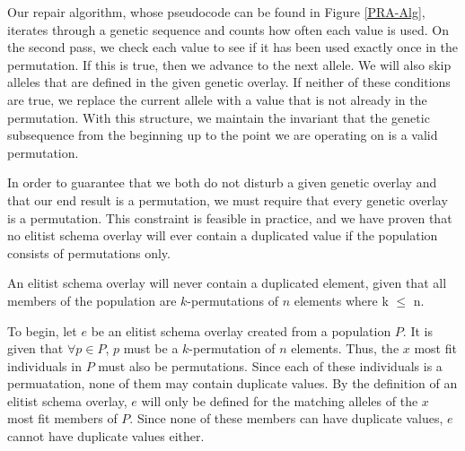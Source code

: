 Our repair algorithm, whose pseudocode can be found in Figure \ref{PRA-Alg}, iterates through a genetic sequence and counts how often each value is used. On the second pass, we check each value to see if it has been used exactly once in the permutation. If this is true, then we advance to the next allele. We will also skip alleles that are defined in the given genetic overlay. If neither of these conditions are true, we replace the current allele with a value that is not already in the permutation. With this structure, we maintain the invariant that the genetic subsequence from the beginning up to the point we are operating on is a valid permutation.

In order to guarantee that we both do not disturb a given genetic overlay and that our end result is a permutation, we must require that every genetic overlay is a permutation. This constraint is feasible in practice, and we have proven that no elitist schema overlay will ever contain a duplicated value if the population consists of permutations only.

\begin{thm}
An elitist schema overlay will never contain a duplicated element, given that all members of the population are $k$-permutations of $n$ elements where k $\leq$ n.
\end{thm}

To begin, let $e$ be an elitist schema overlay created from a population $P$. It is given that $\forall p \in P$, $p$ must be a $k$-permutation of $n$ elements. Thus, the $x$ most fit individuals in $P$ must also be permutations. Since each of these individuals is a permuatation, none of them may contain duplicate values. By the definition of an elitist schema overlay, $e$ will only be defined for the matching alleles of the $x$ most fit members of $P$. Since none of these members can have duplicate values, $e$ cannot have duplicate values either.


